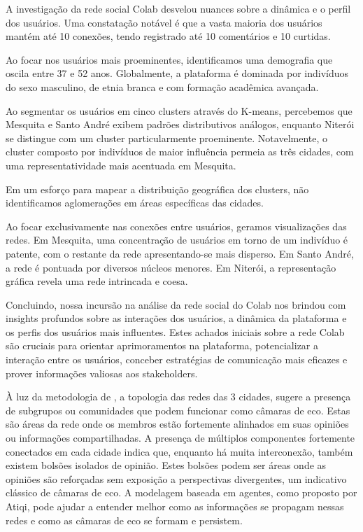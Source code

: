 A investigação da rede social Colab desvelou nuances sobre a dinâmica e o perfil dos usuários. Uma constatação notável é que a vasta maioria dos usuários mantém até 10 conexões, tendo registrado até 10 comentários e 10 curtidas.

Ao focar nos usuários mais proeminentes, identificamos uma demografia que oscila entre 37 e 52 anos. Globalmente, a plataforma é dominada por indivíduos do sexo masculino, de etnia branca e com formação acadêmica avançada.

Ao segmentar os usuários em cinco clusters através do K-means, percebemos que Mesquita e Santo André exibem padrões distributivos análogos, enquanto Niterói se distingue com um cluster particularmente proeminente. Notavelmente, o cluster composto por indivíduos de maior influência permeia as três cidades, com uma representatividade mais acentuada em Mesquita.

Em um esforço para mapear a distribuição geográfica dos clusters, não identificamos aglomerações em áreas específicas das cidades.

Ao focar exclusivamente nas conexões entre usuários, geramos visualizações das redes. Em Mesquita, uma concentração de usuários em torno de um indivíduo é patente, com o restante da rede apresentando-se mais disperso. Em Santo André, a rede é pontuada por diversos núcleos menores. Em Niterói, a representação gráfica revela uma rede intrincada e coesa.

Concluindo, nossa incursão na análise da rede social do Colab nos brindou com insights profundos sobre as interações dos usuários, a dinâmica da plataforma e os perfis dos usuários mais influentes. Estes achados iniciais sobre a rede Colab são cruciais para orientar aprimoramentos na plataforma, potencializar a interação entre os usuários, conceber estratégias de comunicação mais eficazes e prover informações valiosas aos stakeholders.

À luz da metodologia de , a topologia das redes das 3 cidades, sugere a presença de subgrupos ou comunidades que podem funcionar como câmaras de eco. Estas são áreas da rede onde os membros estão fortemente alinhados em suas opiniões ou informações compartilhadas. A presença de múltiplos componentes fortemente conectados em cada cidade indica que, enquanto há muita interconexão, também existem bolsões isolados de opinião. Estes bolsões podem ser áreas onde as opiniões são reforçadas sem exposição a perspectivas divergentes, um indicativo clássico de câmaras de eco. A modelagem baseada em agentes, como proposto por Atiqi, pode ajudar a entender melhor como as informações se propagam nessas redes e como as câmaras de eco se formam e persistem.

